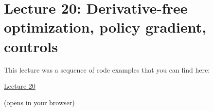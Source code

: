 \section{Lecture 20: Derivative-free optimization, policy gradient, controls}

This lecture was a sequence of code examples that you can find here:

\begin{center}
{\Large
\href{https://ee227c.github.io/code/lecture20.html}{Lecture 20}
}

(opens in your browser)
\end{center}


